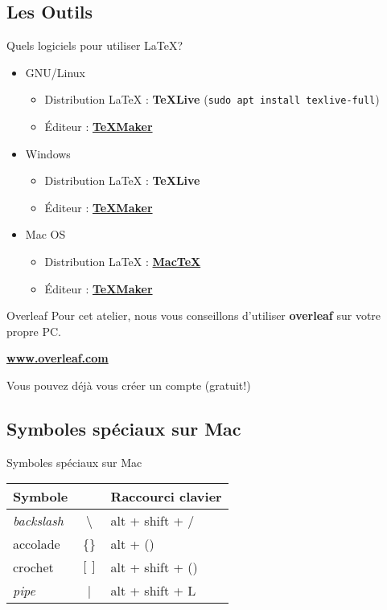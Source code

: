 \subsection{Les Outils}

\begin{frame}{\Warning Quels logiciels pour utiliser \LaTeX{}?}
  \begin{itemize}
      \item GNU/Linux
      \begin{itemize}
          \item Distribution \LaTeX{} : \textbf{TeXLive}
          {\tiny (\lstinline|sudo apt install texlive-full|)}
        \item Éditeur : \textbf{\href{http://www.xm1math.net/texmaker/}{TeXMaker}}
      \end{itemize}
      \item Windows
      \begin{itemize}
        \item Distribution \LaTeX{} : \textbf{TeXLive}
        \item Éditeur : \textbf{\href{http://www.xm1math.net/texmaker/}{TeXMaker}}
      \end{itemize}
      \item Mac OS
      \begin{itemize}
        \item Distribution \LaTeX{} : \textbf{\href{https://www.tug.org/mactex/}{MacTeX}}
        \item Éditeur : \textbf{\href{http://www.xm1math.net/texmaker/}{TeXMaker}}
      \end{itemize}
    \end{itemize}
\end{frame}

\begin{frame}{Overleaf}
  Pour cet atelier, nous vous conseillons d'utiliser \textbf{overleaf} sur votre propre PC.
  \begin{center}
    \textbf{\url{www.overleaf.com}}
  \end{center}
  Vous pouvez déjà vous créer un compte (gratuit!)
\end{frame}
\subsection{Symboles spéciaux sur Mac}

\begin{frame}{Symboles spéciaux sur Mac}
  \begin{center}
    \begin{tabular}{|lc|l|}
      \hline
      Symbole & & Raccourci clavier \\\hline
      \textit{backslash} & \textbackslash & alt + shift + / \\
      accolade & \{\} & alt + () \\
      crochet & $[]$ & alt + shift + () \\
      \textit{pipe} & | & alt + shift + L \\
      \hline
    \end{tabular}
  \end{center}
\end{frame}
